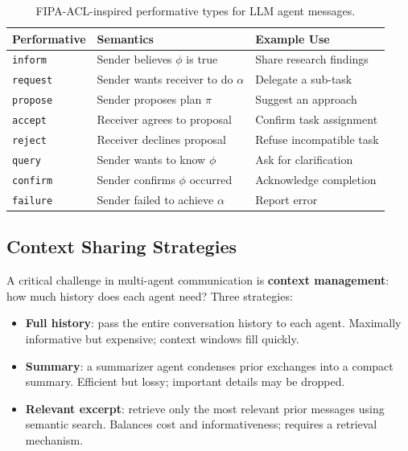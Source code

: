 \begin{table}[ht!]
\centering
\caption{FIPA-ACL-inspired performative types for LLM agent messages.}
\begin{tabular}{@{}lp{5cm}p{8cm}@{}}
\toprule
\textbf{Performative} & \textbf{Semantics} & \textbf{Example Use} \\
\midrule
\texttt{inform} & Sender believes $\phi$ is true & Share research findings \\
\texttt{request} & Sender wants receiver to do $\alpha$ & Delegate a sub-task \\
\texttt{propose} & Sender proposes plan $\pi$ & Suggest an approach \\
\texttt{accept} & Receiver agrees to proposal & Confirm task assignment \\
\texttt{reject} & Receiver declines proposal & Refuse incompatible task \\
\texttt{query} & Sender wants to know $\phi$ & Ask for clarification \\
\texttt{confirm} & Sender confirms $\phi$ occurred & Acknowledge completion \\
\texttt{failure} & Sender failed to achieve $\alpha$ & Report error \\
\bottomrule
\end{tabular}
\end{table}

\subsection{Context Sharing Strategies}
\label{context-sharing-strategies}

A critical challenge in multi-agent communication is \textbf{context management}: how much history does each agent need? Three strategies:

\begin{itemize}
  \item \textbf{Full history}: pass the entire conversation history to each agent. Maximally informative but expensive; context windows fill quickly.
  \item \textbf{Summary}: a summarizer agent condenses prior exchanges into a compact summary. Efficient but lossy; important details may be dropped.
  \item \textbf{Relevant excerpt}: retrieve only the most relevant prior messages using semantic search. Balances cost and informativeness; requires a retrieval mechanism.
\end{itemize}

